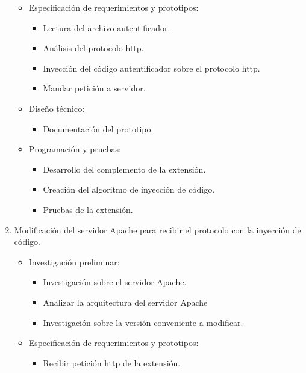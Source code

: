 \documentclass[12pt, a4paper, titlepage]{report}
\begin{document}
\begin{enumerate}
\begin{itemize}
                \item Especificación de requerimientos y prototipos: 
                \begin{itemize}
                    \item  Lectura del archivo autentificador.
                    \item  Análisis del protocolo \acrshort{http}. 
                    \item  Inyección del código autentificador sobre el protocolo \acrshort{http}.
                    \item Mandar petición a servidor.
                \end{itemize}
                \item Diseño técnico:
                \begin{itemize}
                    \item Documentación del prototipo. 
                \end{itemize}
                \item Programación y pruebas: 
                \begin{itemize}
                    \item Desarrollo del complemento de la extensión. 
                    \item Creación del algoritmo de inyección de código. 
                    \item Pruebas de la extensión. 
                \end{itemize}
            \end{itemize}
            \item Modificación del servidor Apache para recibir el protocolo con la inyección de código.
            \begin{itemize}
                \item  Investigación preliminar: 
                \begin{itemize}
                    \item Investigación sobre el servidor Apache.
                    \item Analizar la arquitectura del servidor Apache
                    \item Investigación sobre la versión conveniente a modificar.
                \end{itemize}
                \item Especificación de requerimientos y prototipos: 
                \begin{itemize}
                    \item Recibir petición \acrshort{http} de la extensión. 

\end{itemize}
\end{itemize}
\end{enumerate}
\end{document}
